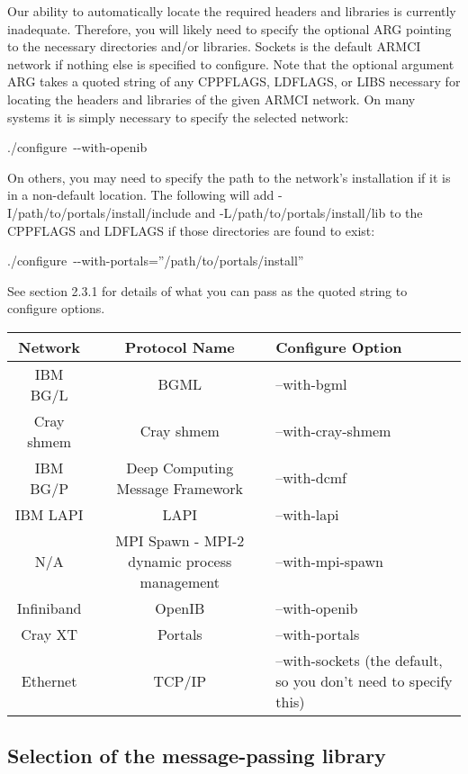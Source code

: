 Our ability to automatically locate the required headers and libraries
is currently inadequate. Therefore, you will likely need to specify
the optional ARG pointing to the necessary directories and/or libraries.
Sockets is the default ARMCI network if nothing else is specified
to configure. Note that the optional argument ARG takes a quoted string
of any CPPFLAGS, LDFLAGS, or LIBS necessary for locating the headers
and libraries of the given ARMCI network. On many systems it is simply
necessary to specify the selected network: 
\begin{lyxcode}
./configure~-{}-with-openib~
\end{lyxcode}
On others, you may need to specify the path to the network's installation
if it is in a non-default location. The following will add -I/path/to/portals/install/include
and -L/path/to/portals/install/lib to the CPPFLAGS and LDFLAGS if
those directories are found to exist: 
\begin{lyxcode}
./configure~-{}-with-portals=\textquotedblright{}/path/to/portals/install\textquotedblright{}~
\end{lyxcode}
See section 2.3.1 for details of what you can pass as the quoted string
to configure options. 

\begin{tabular}{|c|c|>{\centering}p{3cm}|}
\hline 
Network & Protocol Name & Configure Option\tabularnewline
\hline
\hline 
IBM BG/L & BGML & --with-bgml\tabularnewline
\hline 
Cray shmem & Cray shmem & --with-cray-shmem\tabularnewline
\hline 
IBM BG/P & Deep Computing Message Framework & --with-dcmf\tabularnewline
\hline 
IBM LAPI & LAPI & --with-lapi\tabularnewline
\hline 
N/A & MPI Spawn - MPI-2 dynamic process management & --with-mpi-spawn\tabularnewline
\hline 
Infiniband & OpenIB & --with-openib\tabularnewline
\hline 
Cray XT & Portals & --with-portals\tabularnewline
\hline 
Ethernet & TCP/IP & --with-sockets (the default, so you don't need to specify this)\tabularnewline
\hline
\end{tabular}


\subsection{Selection of the message-passing library }

